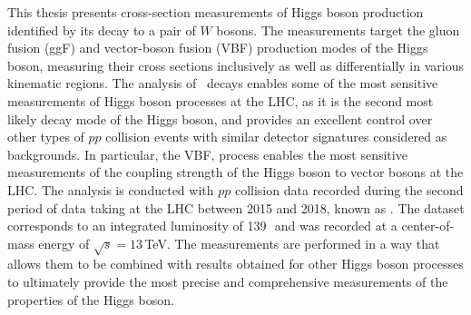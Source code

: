 This thesis presents cross-section measurements of Higgs boson production identified by its decay to a pair of $W$ bosons.
The measurements target the gluon fusion (ggF) and vector-boson fusion (VBF) production modes of the Higgs boson, measuring their cross sections inclusively as well as differentially in various kinematic regions.
The analysis of \HWW\ decays enables some of the most sensitive measurements of Higgs boson processes at the LHC, as it is the second most likely decay mode of the Higgs boson, and provides an excellent control over other types of $pp$ collision events with similar detector signatures considered as backgrounds. 
In particular, the VBF, \HWW process enables the most sensitive measurements of the coupling strength of the Higgs boson to vector bosons at the LHC. 
The analysis is conducted with $pp$ collision data recorded during the second period of data taking at the LHC between 2015 and 2018, known as \RunTwo. The dataset corresponds to an integrated luminosity of 139\,\ifb\ and was recorded at a center-of-mass energy of $\sqrt{s} = 13\,$TeV.
The measurements are performed in a way that allows them to be combined with results obtained for other Higgs boson processes to ultimately provide the most precise and comprehensive measurements of the properties of the Higgs boson.


